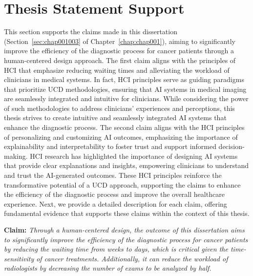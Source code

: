 \section{Thesis Statement Support}
\label{sec:chap007002}

This section supports the claims made in this dissertation (Section~\ref{sec:chap001003} of Chapter~\ref{chap:chap001}), aiming to significantly improve the efficiency of the diagnostic process for cancer patients through a human-centered design approach.
The first claim aligns with the principles of \ac{HCI} that emphasize reducing waiting times and alleviating the workload of clinicians in medical systems.
In fact, \ac{HCI} principles serve as guiding paradigms that prioritize \ac{UCD} methodologies, ensuring that \ac{AI} systems in medical imaging are seamlessly integrated and intuitive for clinicians.
While considering the power of such methodologies to address clinicians' experiences and perceptions, this thesis strives to create intuitive and seamlessly integrated \ac{AI} systems that enhance the diagnostic process.
The second claim aligns with the \ac{HCI} principles of personalizing and customizing \ac{AI} outcomes, emphasizing the importance of explainability and interpretability to foster trust and support informed decision-making.
\ac{HCI} research has highlighted the importance of designing \ac{AI} systems that provide clear explanations and insights, empowering clinicians to understand and trust the \ac{AI}-generated outcomes.
These \ac{HCI} principles reinforce the transformative potential of a \ac{UCD} approach, supporting the claims to enhance the efficiency of the diagnostic process and improve the overall healthcare experience.
Next, we provide a detailed description for each claim, offering fundamental evidence that supports these claims within the context of this thesis.

\vspace{1.00mm}

\begin{displayquote}
{\bf Claim:}
{\it
Through a human-centered design, the outcome of this dissertation aims to significantly improve the efficiency of the diagnostic process for cancer patients by reducing the waiting time from weeks to days, which is critical given the time-sensitivity of cancer treatments.
Additionally, it can reduce the workload of radiologists by decreasing the number of exams to be analyzed by half.
}
\end{displayquote}

\vspace{1.00mm}

